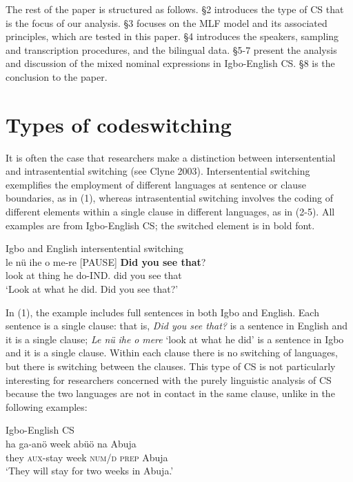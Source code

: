 \documentclass[output=paper]{langsci/langscibook}
\begin{document}
The rest of the paper is structured as follows. §2 introduces the type of CS that is the focus of our analysis. §3 focuses on the MLF model and its associated principles, which are tested in this paper. §4 introduces the speakers, sampling and transcription procedures, and the bilingual data. §5-7 present the analysis and discussion of the mixed nominal expressions in Igbo-English CS. §8 is the conclusion to the paper.  

\section{Types of codeswitching}

It is often the case that researchers make a distinction between intersentential and intrasentential switching (see Clyne 2003). Intersentential switching exemplifies the employment of different languages at sentence or clause boundaries, as in (1), whereas intrasentential switching involves the coding of different elements within a single clause in different languages, as in (2-5). All examples are from Igbo-English CS; the switched element is in bold font.

\ea
{Igbo and English intersentential switching\rmfnm{}}\\
\gll le    nü  ihe  o   me-re    [PAUSE] \textbf{Did you see that}?\\
     look  at  thing  he do-IND.                did  you see that\\
\glt ‘Look at what he did. Did you see that?’
\z
{}


In (1), the example includes full sentences in both Igbo and English. Each sentence is a single clause: that is, \textit{Did you see that? }is a sentence in English and it is a single clause; \textit{Le n}\textit{ü}\textit{ ihe o }\textit{mere} ‘look at what he did’ is a sentence in Igbo and it is a single clause. Within each clause there is no switching of languages, but there is switching between the clauses. This type of CS is not particularly interesting for researchers concerned with the purely linguistic analysis of CS because the two languages are not in contact in the same clause, unlike in the following examples:


\ea
{Igbo-English \textsc{CS}}\\
\gll ha    ga-anö     week  abüö  na  Abuja\\
     they  \textsc{aux}{}-stay  week  \textsc{num/d}  \textsc{prep} Abuja\\
\glt ‘They will stay for two weeks in Abuja.’
\z
\end{document}
